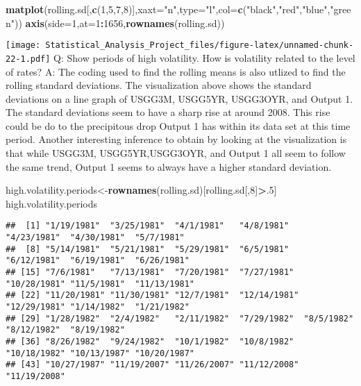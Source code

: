 \documentclass[]{article}
\newenvironment{Shaded}{\begin{snugshade}}{\end{snugshade}}
\newcommand{\KeywordTok}[1]{\textcolor[rgb]{0.13,0.29,0.53}{\textbf{#1}}}
\newcommand{\DataTypeTok}[1]{\textcolor[rgb]{0.13,0.29,0.53}{#1}}
\newcommand{\DecValTok}[1]{\textcolor[rgb]{0.00,0.00,0.81}{#1}}
\newcommand{\StringTok}[1]{\textcolor[rgb]{0.31,0.60,0.02}{#1}}
\newcommand{\OperatorTok}[1]{\textcolor[rgb]{0.81,0.36,0.00}{\textbf{#1}}}
\newcommand{\NormalTok}[1]{#1}
\begin{document}
\begin{Shaded}
\begin{Highlighting}[]
\KeywordTok{matplot}\NormalTok{(rolling.sd[,}\KeywordTok{c}\NormalTok{(}\DecValTok{1}\NormalTok{,}\DecValTok{5}\NormalTok{,}\DecValTok{7}\NormalTok{,}\DecValTok{8}\NormalTok{)],}\DataTypeTok{xaxt=}\StringTok{"n"}\NormalTok{,}\DataTypeTok{type=}\StringTok{"l"}\NormalTok{,}\DataTypeTok{col=}\KeywordTok{c}\NormalTok{(}\StringTok{"black"}\NormalTok{,}\StringTok{"red"}\NormalTok{,}\StringTok{"blue"}\NormalTok{,}\StringTok{"green"}\NormalTok{))}
\KeywordTok{axis}\NormalTok{(}\DataTypeTok{side=}\DecValTok{1}\NormalTok{,}\DataTypeTok{at=}\DecValTok{1}\OperatorTok{:}\DecValTok{1656}\NormalTok{,}\KeywordTok{rownames}\NormalTok{(rolling.sd))}
\end{Highlighting}
\end{Shaded}

\texttt{[image: Statistical\_Analysis\_Project\_files/figure-latex/unnamed-chunk-22-1.pdf]}
Q: Show periods of high volatility. How is volatility related to the
level of rates? A: The coding used to find the rolling means is also
utlized to find the rolling standard deviations. The visualization above
shows the standard deviations on a line graph of USGG3M, USGG5YR,
USGG3OYR, and Output 1. The standard deviations seem to have a sharp
rise at around 2008. This rise could be do to the precipitous drop
Output 1 has within its data set at this time period. Another
interesting inference to obtain by looking at the visualization is that
while USGG3M, USGG5YR,USGG3OYR, and Output 1 all seem to follow the same
trend, Output 1 seems to always have a higher standard deviation.

\begin{Shaded}
\begin{Highlighting}[]
\NormalTok{high.volatility.periods<-}\KeywordTok{rownames}\NormalTok{(rolling.sd)[rolling.sd[,}\DecValTok{8}\NormalTok{]}\OperatorTok{>}\NormalTok{.}\DecValTok{5}\NormalTok{]}
\NormalTok{high.volatility.periods}
\end{Highlighting}
\end{Shaded}

\begin{verbatim}
##  [1] "1/19/1981"  "3/25/1981"  "4/1/1981"   "4/8/1981"   "4/23/1981"  "4/30/1981"  "5/7/1981"  
##  [8] "5/14/1981"  "5/21/1981"  "5/29/1981"  "6/5/1981"   "6/12/1981"  "6/19/1981"  "6/26/1981" 
## [15] "7/6/1981"   "7/13/1981"  "7/20/1981"  "7/27/1981"  "10/28/1981" "11/5/1981"  "11/13/1981"
## [22] "11/20/1981" "11/30/1981" "12/7/1981"  "12/14/1981" "12/29/1981" "1/14/1982"  "1/21/1982" 
## [29] "1/28/1982"  "2/4/1982"   "2/11/1982"  "7/29/1982"  "8/5/1982"   "8/12/1982"  "8/19/1982" 
## [36] "8/26/1982"  "9/24/1982"  "10/1/1982"  "10/8/1982"  "10/18/1982" "10/13/1987" "10/20/1987"
## [43] "10/27/1987" "11/19/2007" "11/26/2007" "11/12/2008" "11/19/2008"
\end{verbatim}
\end{document}
